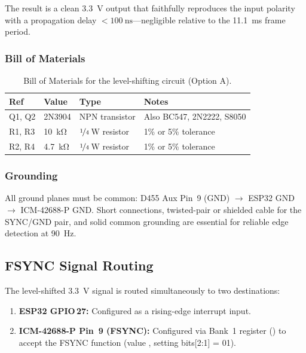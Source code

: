 The result is a clean \SI{3.3}{\volt} output that faithfully reproduces the input polarity with a propagation delay $<\SI{100}{\nano\second}$---negligible relative to the \SI{11.1}{\milli\second} frame period.

\subsubsection{Bill of Materials}

\begin{table}[H]
  \centering
  \caption{Bill of Materials for the level-shifting circuit (Option A).}
  \label{tab:bom}
  \begin{tabular}{llll}
    \toprule
    \textbf{Ref} & \textbf{Value} & \textbf{Type} & \textbf{Notes} \\
    \midrule
    Q1, Q2   & 2N3904  & NPN transistor          & Also BC547, 2N2222, S8050 \\
    R1, R3   & \SI{10}{\kilo\ohm}  & $\nicefrac{1}{4}$\,W resistor & 1\% or 5\% tolerance \\
    R2, R4   & \SI{4.7}{\kilo\ohm} & $\nicefrac{1}{4}$\,W resistor & 1\% or 5\% tolerance \\
    \bottomrule
  \end{tabular}
\end{table}

\subsubsection{Grounding}
All ground planes must be common: D455 Aux Pin~9 (GND) $\rightarrow$ ESP32 GND $\rightarrow$ ICM-42688-P GND.
Short connections, twisted-pair or shielded cable for the SYNC/GND pair, and solid common grounding are essential for reliable edge detection at \SI{90}{\hertz}.


\subsection{FSYNC Signal Routing}

The level-shifted \SI{3.3}{\volt}  signal is routed simultaneously to two destinations:
\begin{enumerate}[nosep]
  \item \textbf{ESP32 GPIO\,27:} Configured as a rising-edge interrupt input.
  \item \textbf{ICM-42688-P Pin~9 (FSYNC):} Configured via Bank~1 register  () to accept the FSYNC function (value , setting bits[2:1] = 01).
\end{enumerate}

